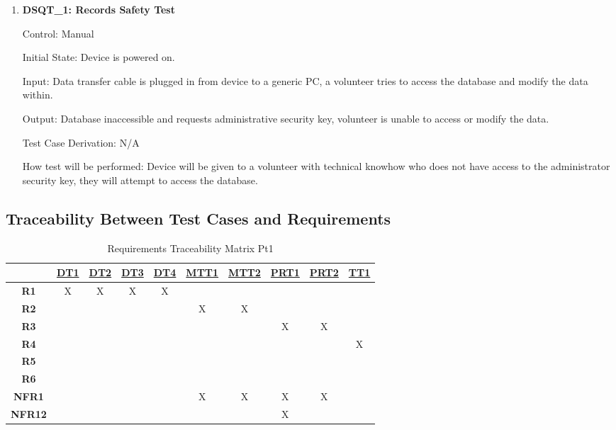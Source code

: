 \documentclass[12pt, titlepage]{article}
\begin{document}
\begin{enumerate}

\item{\textbf{DSQT\_1: Records Safety Test}}\label{DSQT1}

Control: Manual

Initial State: Device is powered on.

Input: Data transfer cable is plugged in from device to a generic PC, a volunteer tries to access the database and modify the data within.

Output: Database inaccessible and requests administrative security key, volunteer is unable to access or modify the data.

Test Case Derivation: N/A

How test will be performed: Device will be given to a volunteer with technical knowhow who does not have access to the administrator security key, they will attempt to access the database. 


\end{enumerate}



\subsection{Traceability Between Test Cases and Requirements}


\noindent
\begin{table}[H]
	\centering
	\begin{tabular}{|c|c|c|c|c|c|c|c|c|c|}
	\hline
		& \hyperref[DT1]{DT1}& \hyperref[DT2]{DT2}&\hyperref[DT3]{DT3}& \hyperref[DT4]{DT4} &\hyperref[MTT1]{MTT1}&\hyperref[MTT2]{MTT2}&\hyperref[PRT1]{PRT1}&\hyperref[PRT2]{PRT2}&\hyperref[TT1]{TT1} \\
	\hline       
	\textbf{R1}         &X&X&X&X&&&&& \\ \hline
	\textbf{R2}         &&&&&X&X&&&\\ \hline
	\textbf{R3}         &&&&&&&X&X& \\ \hline
	\textbf{R4}         &&&&&&&&&X\\ \hline
	\textbf{R5}         &&&&&&&&& \\ \hline
	\textbf{R6}         &&&&&&&&&\\ \hline
	\textbf{NFR1}     &&&&&X&X&X&X& \\ \hline
	\textbf{NFR12}   &&&&&&&X&&\\ \hline
	\hline
	\end{tabular}
	\caption{ Requirements Traceability Matrix Pt1}
	\label{Table:A_trace}
\end{table}
\end{document}
